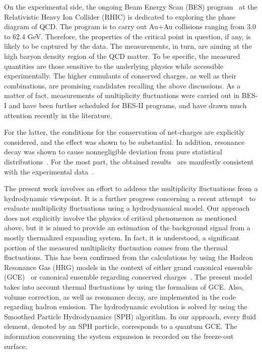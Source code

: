 \documentclass[secnumarabic, graphics,floatfix, nofootinbib,tightenlines,nobibnotes, aps, prl, 12pt]{revtex4-1}
\begin{document}
On the experimental side, the ongoing Beam Energy Scan (BES) program~\cite{RHIC-star-bes-01, RHIC-star-bes-03, RHIC-star-bes-05,RHIC-star-mul-fluctuations-03,RHIC-star-mul-fluctuations-04} at the Relativistic Heavy Ion Collider (RHIC) is dedicated to exploring the phase diagram of QCD.
The program is to carry out Au+Au collisions ranging from 3.0 to 62.4 GeV.
Therefore, the properties of the critical point in question, if any, is likely to be captured by the data. 
The measurements, in turn, are aiming at the high baryon density region of the QCD matter.
To be specific, the measured quantities are those sensitive to the underlying physics while accessible experimentally.
The higher cumulants of conserved charges, as well as their combinations, are promising candidates recalling the above discussions.
As a matter of fact, measurements of multiplicity fluctuations were carried out in BES-I and have been further scheduled for BES-II programs, and have drawn much attention recently in the literature.

For the latter, the conditions for the conservation of net-charges are explicitly considered, and the effect was shown to be substantial.
In addition, resonance decay was shown to cause nonnegligible deviation from pure statistical distributions~\cite{statistical-model-03,statistical-model-04,statistical-model-07}.
For the most part, the obtained results~\cite{statistical-model-05,statistical-model-06,statistical-model-07,statistical-model-08,statistical-model-09,statistical-model-10} are manifestly consistent with the experimental data~\cite{RHIC-star-mul-fluctuations-01,RHIC-star-mul-fluctuations-02}.

The present work involves an effort to address the multiplicity fluctuations from a hydrodynamic viewpoint.
It is a further progress concerning a recent attempt~\cite{sph-bes-01} to evaluate multiplicity fluctuations using a hydrodynamical model.
Our approach does not explicitly involve the physics of critical phenomenon as mentioned above, but it is aimed to provide an estimation of the background signal from a mostly thermalized expanding system.
In fact, it is understood, a significant portion of the measured multiplicity fluctuation comes from the thermal fluctuations.
This has been confirmed from the calculations by using the Hadron Resonance Gas (HRG) models in the context of either grand canonical ensemble (GCE)~\cite{statistical-model-05,statistical-model-06,statistical-model-07} or canonical ensemble regarding conserved charges~\cite{statistical-model-03,statistical-model-04,statistical-model-08}.
The present model takes into account thermal fluctuations by using the formalism of GCE.
Also, volume correction, as well as resonance decay, are implemented in the code regarding hadron emission.
The hydrodynamic evolution is solved by using the Smoothed Particle Hydrodynamics (SPH) algorithm.
In our approach, every fluid element, denoted by an SPH particle, corresponds to a quantum GCE.
The information concerning the system expansion is recorded on the freeze-out surface.
\end{document}
